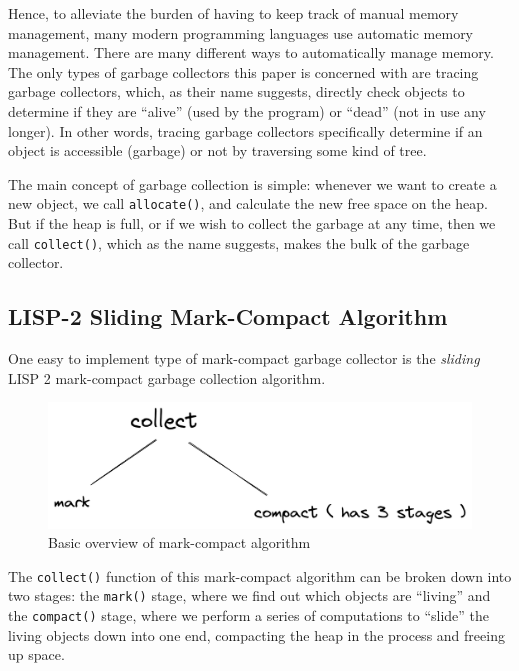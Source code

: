 \documentclass[index]{subfiles}
\begin{document}
Hence, to alleviate the burden of having to keep track of manual memory management, many modern programming languages use automatic memory management. There are many different ways to automatically manage memory. The only types of garbage collectors this paper is concerned with are tracing garbage collectors, which, as their name suggests, directly check objects to determine if they are ``alive'' (used by the program) or ``dead'' (not in use any longer)\cite{a_unified_theory_of_garbage_collection}. In other words, tracing garbage collectors specifically determine if an object is accessible (garbage) or not by traversing some kind of tree\cite[Chapter~1]{gc_handbook}.

The main concept of garbage collection is simple: whenever we want to create a new object, we call \verb+allocate()+, and calculate the new free space on the heap. But if the heap is full, or if we wish to collect the garbage at any time, then we call \verb+collect()+\cite{gc_handbook}, which as the name suggests, makes the bulk of the garbage collector.

\subsection{LISP-2 Sliding Mark-Compact Algorithm}

One easy to implement type of mark-compact garbage collector is the \textit{sliding} LISP 2 mark-compact garbage collection algorithm.

\begin{figure}[H]
    \centering
    \includegraphics[scale=0.3]{pics/mark-compact-overview.png}
    \caption{Basic overview of mark-compact algorithm}
\end{figure}

The \verb+collect()+ function of this mark-compact algorithm can be broken down into two stages: the \verb+mark()+ stage, where we find out which objects are ``living'' and the \verb+compact()+ stage, where we perform a series of computations to ``slide'' the living objects down into one end, compacting the heap in the process and freeing up space\cite[Chapter~3]{gc_handbook}.
\end{document}
